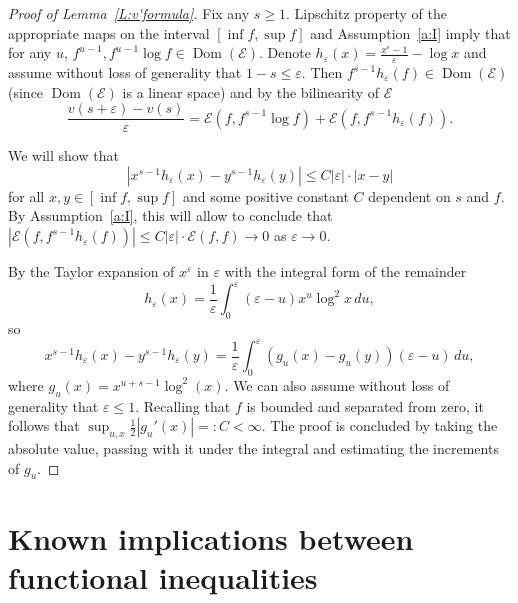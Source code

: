 \documentclass[a4paper]{amsart}
\theoremstyle{definition}
\theoremstyle{remark}
\numberwithin{equation}{section}
\DeclareMathOperator{\Dom}{Dom} %
\newcommand*{\calE}{\mathcal{E}}
\newcommand*{\abs}[1]{\left\vert #1 \right\vert}
\begin{document}
\begin{proof}[Proof of Lemma~\ref{L:v'formula}]
	Fix any $s\ge 1$.	
	Lipschitz property of the appropriate maps on the interval $[\inf f,\sup f]$ and Assumption~\ref{a:I} imply that for any $u$, $f^{u-1},f^{u-1}\log f\in \Dom(\calE)$.
	Denote $h_\varepsilon(x) = \frac{x^{\varepsilon}-1}{\varepsilon}-\log x$ and assume without loss of generality that $1-s\le \varepsilon$.	
	Then $f^{s-1}h_\varepsilon(f)\in \Dom(\calE)$ (since $\Dom(\calE)$ is a linear space) and by the bilinearity of $\calE$
	\begin{equation*}\label{eq:v'}
			\frac{v(s+\varepsilon)-v(s)}{\varepsilon} = \calE(f,f^{s-1}\log f) + \calE(f,f^{s-1}h_\varepsilon(f)).
	\end{equation*}
	
	We will show that
	\[
		\abs{x^{s-1}h_\varepsilon(x) - y^{s-1}h_\varepsilon(y) }
		\le
		C\abs{\varepsilon}\cdot\abs{x-y}
	\]
	for all $x,y\in [\inf f,\sup f]$ and some positive constant $C$ dependent on $s$ and $f$.
	By Assumption~\ref{a:I}, this will allow to conclude that $\abs{\calE(f,f^{s-1}h_\varepsilon(f))}\le C\abs{\varepsilon}\cdot\calE(f,f)\to 0$ as $\varepsilon\to 0$.

	By the Taylor expansion of $x^\varepsilon$ in $\varepsilon$ with the integral form of the remainder
	\[
		h_\varepsilon(x) = \frac{1}{\varepsilon}\int_0^\varepsilon (\varepsilon-u)x^u\log^2x\,du,
	\]
	so
	\[
		x^{s-1}h_\varepsilon(x) - y^{s-1}h_\varepsilon(y)  =
		\frac{1}{\varepsilon}\int_0^\varepsilon ({g}_u(x)-{g}_u(y))(\varepsilon-u)\,du,
	\]
	where ${g}_u(x)=x^{u+s-1}\log^2(x)$. %
	We can also assume without loss of generality that $\varepsilon\le 1$.
	Recalling that $f$ is bounded and separated from zero, it follows that $\sup_{u,x}\frac{1}{2}{\abs{g_u'(x)}} =: C < \infty$.
	The proof is concluded by taking the absolute value, passing with it under the integral and estimating the increments of $g_u$.
	
	
\end{proof}



\section{Known implications between functional inequalities}
\label{app-implications}
\end{document}
